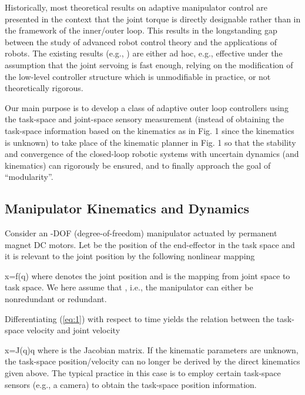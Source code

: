 \documentclass[9pt,technote]{IEEEtran}
\def \be {}
\begin{document}
Historically, most theoretical results on adaptive manipulator control are presented in the context that the joint torque is directly designable rather than in the framework of the inner/outer loop. This results in the longstanding gap between the study of advanced robot control theory and the applications of robots. The existing results (e.g., \cite{Aicardi1995_ICRA,Roy2002_TRA,Kelly2005_AUT,Grotjahn2002_IJRR,Weiss1987_JRA,Siciliano1990_Robotica,Hutchinson1996_TRA}) are either ad hoc, e.g., effective under the assumption that the joint servoing is fast enough, relying on the modification of the low-level controller structure which is unmodifiable in practice, or not theoretically rigorous.

{Our main purpose is to develop a class of adaptive outer loop controllers using the task-space and joint-space sensory measurement (instead of obtaining the task-space information based on the kinematics as in Fig. 1 since the kinematics is unknown) to take place of the kinematic planner in Fig. 1 so that the stability and convergence of the closed-loop robotic systems with uncertain dynamics (and kinematics) can rigorously be ensured, and to finally approach the goal of ``modularity''}.



\subsection{Manipulator Kinematics and Dynamics}

Consider an -DOF (degree-of-freedom) manipulator actuated by permanent magnet DC motors. Let  be the position of the end-effector in the task space and it is relevant to the joint position by the following nonlinear mapping \cite{Craig2005_Book,Spong2006_Book}
\be
\label{eq:1}
x=f(q)
\ee
where  denotes the joint position and  is the mapping from joint space to task space. We here assume that , i.e., the manipulator can either be nonredundant or redundant.

Differentiating (\ref{eq:1}) with respect to time yields the relation between the task-space velocity  and joint velocity  \cite{Craig2005_Book,Spong2006_Book}
\be
\label{eq:2}
\dot x=J(q)\dot q
\ee
where  is the Jacobian matrix. If the kinematic parameters are unknown, the task-space position/velocity can no longer be derived by the direct kinematics given above. The typical practice in this case is to employ certain task-space sensors (e.g., a camera) to obtain the task-space position information.
\end{document}
